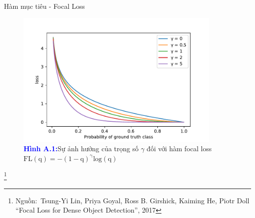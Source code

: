 \documentclass[
	10pt,                %
	aspectratio=169,     %
]{beamer}
\newcommand\footnotesource[1]{					%
	\vspace{-10mm}\let\thefootnote\relax\footnote{\hspace{-3mm}\tiny Nguồn:~#1}
}
\begin{document}
	\begin{frame}[noframenumbering]{Hàm mục tiêu - Focal Loss}
	    \vspace{-0.8cm}
        \begin{figure}[H]
            \centering
            \includegraphics[width=10cm]{Presentation_template/figures/focal.pdf}
            \caption*{\textcolor{blue}{\textbf{Hình A.1:}}Sự ảnh hưởng của trọng số $\gamma$ đối với hàm focal loss $\mathrm{FL(q)=-(1-q)^\gamma \mathrm{log}(q)}$ }
        \end{figure}
        \footnotesource{Tsung{-}Yi Lin, Priya Goyal, Ross B. Girshick, Kaiming He, Piotr Doll ``Focal Loss for Dense Object Detection'', 2017} 
	\end{frame}    
	
\end{document}
